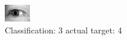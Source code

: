 \begin{figure}[h!]
\begin{center}
\includegraphics[width=0.60\columnwidth]{figures/ID3247_class_3_target_4.png}
\end{center}
\caption{ Classification: 3 actual target: 4}
\label{fig:ID3247_class_3_target_4}
\end{figure}
